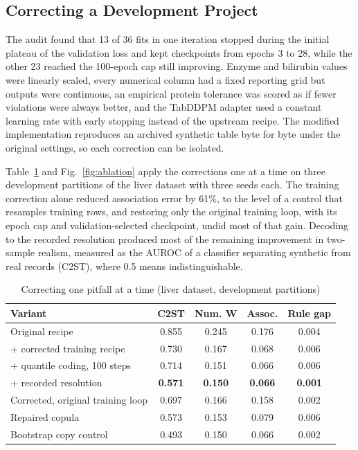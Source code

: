 \documentclass[conference]{IEEEtran}
\begin{document}
\subsection{Correcting a Development Project}

The audit found that 13 of 36 fits in one iteration stopped during the initial plateau of the validation loss and kept checkpoints from epochs 3 to 28, while the other 23 reached the 100-epoch cap still improving. Enzyme and bilirubin values were linearly scaled, every numerical column had a fixed reporting grid but outputs were continuous, an empirical protein tolerance was scored as if fewer violations were always better, and the TabDDPM adapter used a constant learning rate with early stopping instead of the upstream recipe. The modified implementation reproduces an archived synthetic table byte for byte under the original settings, so each correction can be isolated.

Table~\ref{tab:ablation} and Fig.~\ref{fig:ablation} apply the corrections one at a time on three development partitions of the liver dataset with three seeds each. The training correction alone reduced association error by 61\%, to the level of a control that resamples training rows, and restoring only the original training loop, with its epoch cap and validation-selected checkpoint, undid most of that gain. Decoding to the recorded resolution produced most of the remaining improvement in two-sample realism, measured as the AUROC of a classifier separating synthetic from real records (C2ST), where 0.5 means indistinguishable.

\begin{table}[t]
\caption{Correcting one pitfall at a time (liver dataset, development partitions)}
\label{tab:ablation}
\centering
\setlength{\tabcolsep}{4pt}
\begin{tabular}{lcccc}
\toprule
Variant & C2ST & Num. W & Assoc. & Rule gap \\
\midrule
Original recipe & 0.855 & 0.245 & 0.176 & 0.004 \\
+ corrected training recipe & 0.730 & 0.167 & 0.068 & 0.006 \\
+ quantile coding, 100 steps & 0.714 & 0.151 & 0.066 & 0.006 \\
+ recorded resolution & \textbf{0.571} & \textbf{0.150} & \textbf{0.066} & \textbf{0.001} \\
Corrected, original training loop & 0.697 & 0.166 & 0.158 & 0.002 \\
Repaired copula & 0.573 & 0.153 & 0.079 & 0.006 \\
Bootstrap copy control & 0.493 & 0.150 & 0.066 & 0.002 \\
\bottomrule
\end{tabular}
\end{table}
\end{document}
